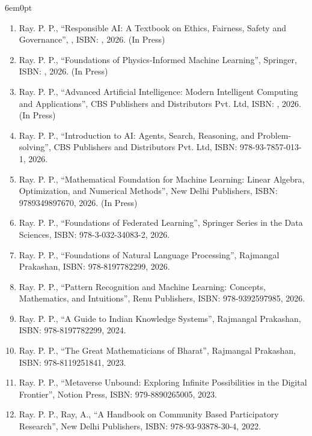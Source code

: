 \documentclass[11pt,a4paper]{moderncv}
\begin{document}
\begin{adjustwidth}{6em}{0pt}
	\begin{enumerate}
		
		\item Ray. P. P., “Responsible AI: A Textbook on Ethics, Fairness, Safety and Governance”, , ISBN: , 2026. (In Press)
			
		\item Ray. P. P., “Foundations of Physics-Informed Machine Learning”, Springer, ISBN: , 2026. (In Press)

		\item Ray. P. P., “Advanced Artificial Intelligence: Modern Intelligent Computing and Applications”, CBS Publishers and Distributors Pvt. Ltd, ISBN: , 2026. (In Press)

		\item Ray. P. P., “Introduction to AI: Agents, Search, Reasoning, and Problem-solving”, CBS Publishers and Distributors Pvt. Ltd, ISBN: 978-93-7857-013-1, 2026. 

		\item Ray. P. P., “Mathematical Foundation for Machine Learning: Linear Algebra, Optimization, and Numerical Methods”, New Delhi Publishers, ISBN: 9789349897670, 2026. (In Press)
		
		\item Ray. P. P., “Foundations of Federated Learning”, Springer Series in the Data Sciences, ISBN: 978-3-032-34083-2, 2026.
		
		\item Ray. P. P., “Foundations of Natural Language Processing”, Rajmangal Prakashan, ISBN: 978-8197782299, 2026.
		
		\item Ray. P. P., “Pattern Recognition and Machine Learning: Concepts, Mathematics, and Intuitions”, Renu Publishers, ISBN: 978-9392597985, 2026.
		
		\item Ray. P. P., “A Guide to Indian Knowledge Systems”, Rajmangal Prakashan, ISBN: 978-8197782299, 2024.
		
		\item Ray. P. P., “The Great Mathematicians of Bharat”, Rajmangal Prakashan, ISBN: 978-8119251841, 2023.
		
		\item Ray. P. P., “Metaverse Unbound: Exploring Infinite Possibilities in the Digital Frontier”, Notion Press, ISBN: 979-8890265005, 2023.
		
		\item Ray. P. P., Ray, A., “A Handbook on Community Based Participatory Research”, New Delhi Publishers, ISBN: 978-93-93878-30-4, 2022.
		

\end{enumerate}
\end{adjustwidth}
\end{document}
